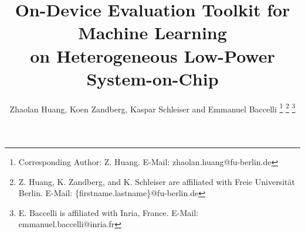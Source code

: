 \documentclass[journal]{IEEEtran}
\begin{document}
%
\title{On-Device Evaluation Toolkit for Machine Learning \\ on Heterogeneous Low-Power System-on-Chip}
%
%
%

\author{Zhaolan Huang, Koen Zandberg, Kaspar Schleiser and Emmanuel Baccelli%
\thanks{Corresponding Author: Z. Huang. E-Mail: zhaolan.huang@fu-berlin.de}%
\thanks{Z. Huang, K. Zandberg, and K. Schleiser are affiliated with Freie Universität Berlin. E-Mail: \{firstname.lastname\}@fu-berlin.de}%
\thanks{E. Baccelli is affiliated with Inria, France. E-Mail: emmanuel.baccelli@inria.fr}
}

% 
%
\end{document}
